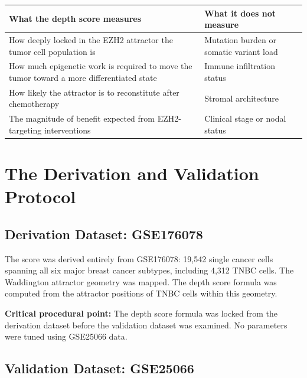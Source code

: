 \documentclass[12pt, a4paper]{article}
\begin{document}
\begin{center}
\begin{tabular}{p{6cm}p{6.5cm}}
\toprule
\textbf{What the depth score measures} &
\textbf{What it does not measure} \\
\midrule
How deeply locked in the EZH2 attractor
the tumor cell population is &
Mutation burden or somatic variant load \\[0.4em]
How much epigenetic work is required to
move the tumor toward a more differentiated
state &
Immune infiltration status \\[0.4em]
How likely the attractor is to reconstitute
after chemotherapy &
Stromal architecture \\[0.4em]
The magnitude of benefit expected from
EZH2-targeting interventions &
Clinical stage or nodal status \\
\bottomrule
\end{tabular}
\end{center}

\section{The Derivation and Validation Protocol}

\subsection{Derivation Dataset: GSE176078}

The score was derived entirely from GSE176078:
19,542 single cancer cells spanning all six
major breast cancer subtypes, including 4,312
TNBC cells. The Waddington attractor geometry
was mapped. The depth score formula was
computed from the attractor positions of TNBC
cells within this geometry.

\textbf{Critical procedural point:} The depth
score formula was locked from the derivation
dataset before the validation dataset was
examined. No parameters were tuned using
GSE25066 data.

\subsection{Validation Dataset: GSE25066}
\end{document}
